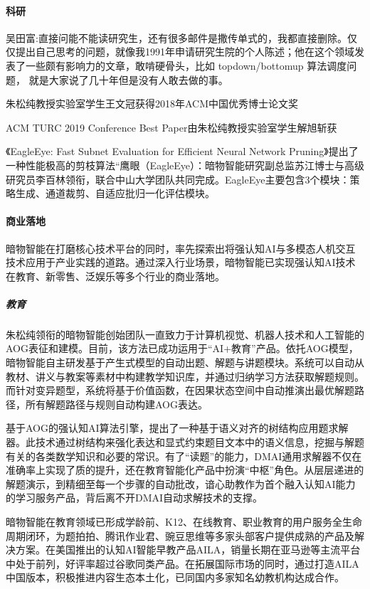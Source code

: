 \documentclass[letterpaper,10pt,english]{sphinxmanual}
\begin{document}
\paragraph{科研}
\label{\detokenize{chapter_AI_company/dm-ai:id7}}
吴田富:直接问能不能读研究生，还有很多邮件是撒传单式的，我都直接删除。仅仅提出自己思考的问题，就像我1991年申请研究生院的个人陈述；他在这个领域发表了一些颇有影响力的文章，敢啃硬骨头，比如
top\sphinxhyphen{}down/bottom\sphinxhyphen{}up 算法调度问题，
就是大家说了几十年但是没有人敢去做的事。

朱松纯教授实验室学生王文冠获得2018年ACM中国优秀博士论文奖

ACM TURC 2019 Conference Best Paper由朱松纯教授实验室学生解旭斩获

《EagleEye: Fast Sub\sphinxhyphen{}net Evaluation for Efficient Neural Network
Pruning》提出了一种性能极高的剪枝算法“鹰眼（EagleEye）：暗物智能研究副总监苏江博士与高级研究员李百林领衔，联合中山大学团队共同完成。EagleEye主要包含3个模块：策略生成、通道裁剪、自适应批归一化评估模块。


\paragraph{商业落地}
\label{\detokenize{chapter_AI_company/dm-ai:id8}}
暗物智能在打磨核心技术平台的同时，率先探索出将强认知AI与多模态人机交互技术应用于产业实践的道路。通过深入行业场景，暗物智能已实现强认知AI技术在教育、新零售、泛娱乐等多个行业的商业落地。


\subparagraph{教育}
\label{\detokenize{chapter_AI_company/dm-ai:id9}}
朱松纯领衔的暗物智能创始团队一直致力于计算机视觉、机器人技术和人工智能的AOG表征和建模。目前，该方法已成功运用于“AI+教育”产品。依托AOG模型，暗物智能自主研发基于产生式模型的自动出题、解题与讲题模块。系统可以自动从教材、讲义与教案等素材中构建教学知识库，并通过归纳学习方法获取解题规则。而针对变异题型，系统将基于价值函数，在因果状态空间中自动推演出最优解题路径，所有解题路径与规则自动构建AOG表达。

基于AOG的强认知AI算法引擎，提出了一种基于语义对齐的树结构应用题求解器。此技术通过树结构来强化表达和显式约束题目文本中的语义信息，挖掘与解题有关的各类数学知识和必要的常识。有了“读题”的能力，DMAI通用求解器不仅在准确率上实现了质的提升，还在教育智能化产品中扮演“中枢”角色。从层层递进的解题演示，到精细至每一个步骤的自动批改，谙心助教作为首个融入认知AI能力的学习服务产品，背后离不开DMAI自动求解技术的支撑。

暗物智能在教育领域已形成学龄前、K12、在线教育、职业教育的用户服务全生命周期闭环，为题拍拍、腾讯作业君、豌豆思维等多家头部客户提供成熟的产品及解决方案。在美国推出的认知AI智能早教产品AILA，销量长期在亚马逊等主流平台中处于前列，好评率超过谷歌同类产品。在拓展国际市场的同时，通过打造AILA中国版本，积极推进内容生态本土化，已同国内多家知名幼教机构达成合作。
\end{document}
